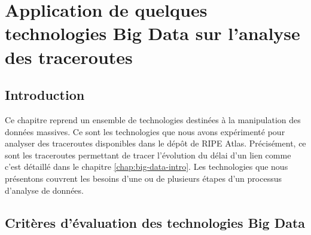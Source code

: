 \chapter{Application de quelques technologies Big Data sur l'analyse des  traceroutes} \label{chap:application-on-traceroutes}


\section{Introduction}

Ce chapitre reprend un ensemble de   technologies destinées  à la manipulation des données massives. Ce sont les technologies que nous avons expérimenté pour analyser des traceroutes disponibles dans le dépôt de RIPE Atlas. Précisément, ce sont les traceroutes permettant de tracer l'évolution du délai d'un lien comme c'est détaillé dans le chapitre \ref{chap:big-data-intro}.
Les technologies que nous présentons  couvrent les besoins d'une ou de plusieurs étapes d'un processus d'analyse de données.
 

\section{Critères d'évaluation des technologies  Big Data}

